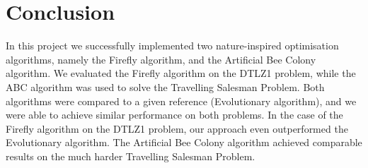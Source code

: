 \section{Conclusion}

In this project we successfully implemented two nature-inspired optimisation algorithms, namely the Firefly algorithm, and the Artificial Bee Colony algorithm. We evaluated the Firefly algorithm on the DTLZ1 problem, while the ABC algorithm was used to solve the Travelling Salesman Problem. Both algorithms were compared to a given reference (Evolutionary algorithm), and we were able to achieve similar performance on both problems. In the case of the Firefly algorithm on the DTLZ1 problem, our approach even outperformed the Evolutionary algorithm. The Artificial Bee Colony algorithm achieved comparable results on the much harder Travelling Salesman Problem.
